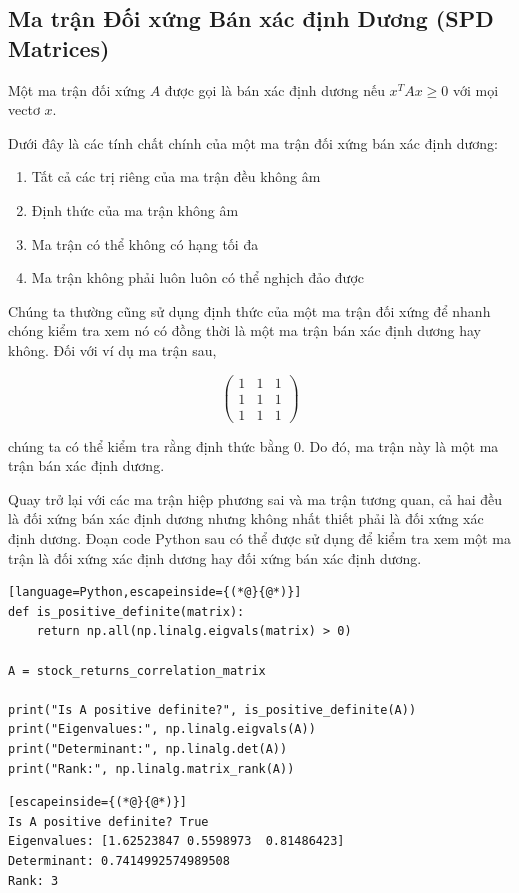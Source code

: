 \subsection{Ma trận Đối xứng Bán xác định Dương (SPD Matrices)}

Một ma trận đối xứng $A$ được gọi là bán xác định dương nếu $x^{T}Ax\ge 0$ với mọi vectơ $x$.

Dưới đây là các tính chất chính của một ma trận đối xứng bán xác định dương:

\begin{enumerate}
  \item Tất cả các trị riêng của ma trận đều không âm
  \item Định thức của ma trận không âm
  \item Ma trận có thể không có hạng tối đa
  \item Ma trận không phải luôn luôn có thể nghịch đảo được
\end{enumerate}
Chúng ta thường cũng sử dụng định thức của một ma trận đối xứng để nhanh chóng kiểm tra xem nó có đồng thời là một ma trận bán xác định dương hay không. Đối với ví dụ ma trận sau,

\[\begin{pmatrix} 1 & 1 & 1 \\ 1 & 1 & 1 \\ 1 & 1 & 1 \end{pmatrix}\]

chúng ta có thể kiểm tra rằng định thức bằng 0. Do đó, ma trận này là một ma trận bán xác định dương.

Quay trở lại với các ma trận hiệp phương sai và ma trận tương quan, cả hai đều là đối xứng bán xác định dương nhưng không nhất thiết phải là đối xứng xác định dương. Đoạn code Python sau có thể được sử dụng để kiểm tra xem một ma trận là đối xứng xác định dương hay đối xứng bán xác định dương.

\begin{lstlisting}[language=Python,escapeinside={(*@}{@*)}]
def is_positive_definite(matrix):
    return np.all(np.linalg.eigvals(matrix) > 0)

A = stock_returns_correlation_matrix

print("Is A positive definite?", is_positive_definite(A))
print("Eigenvalues:", np.linalg.eigvals(A))
print("Determinant:", np.linalg.det(A))
print("Rank:", np.linalg.matrix_rank(A))
\end{lstlisting}

\begin{lstlisting}[escapeinside={(*@}{@*)}]
Is A positive definite? True
Eigenvalues: [1.62523847 0.5598973  0.81486423]
Determinant: 0.7414992574989508
Rank: 3
\end{lstlisting}

